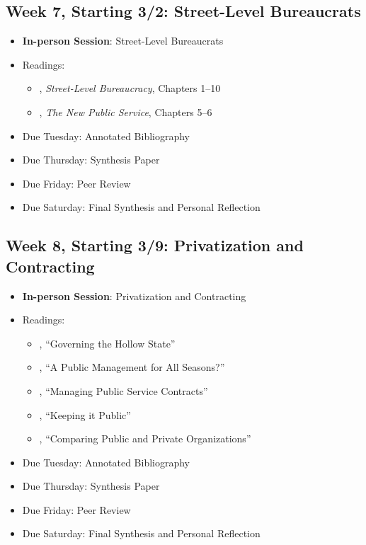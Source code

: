 \documentclass[12pt, letterpaper]{article}
\begin{document}
\subsection*{Week 7, Starting 3/2: Street-Level Bureaucrats}
\begin{itemize}
    \item \textbf{In-person Session}: Street-Level Bureaucrats
    \item Readings:
        \begin{itemize}
            \item \citet{Lipsky2010}, \emph{Street-Level Bureaucracy}, Chapters 1--10 
            \item \citet{Denhardt2015}, \emph{The New Public Service}, Chapters 5--6 
        \end{itemize}
    \item Due Tuesday: Annotated Bibliography
    \item Due Thursday: Synthesis Paper
    \item Due Friday: Peer Review
    \item Due Saturday: Final Synthesis and Personal Reflection
\end{itemize}

\subsection*{Week 8, Starting 3/9: Privatization and Contracting}
\begin{itemize}
    \item \textbf{In-person Session}: Privatization and Contracting
    \item Readings:
        \begin{itemize}
            \item \citet{MILWARD2000a}, ``Governing the Hollow State''
            \item \cite{hood1991}, ``A Public Management for All Seasons?''
            \item \citet{brownManagingPublicService2006}, ``Managing Public Service Contracts''
            \item \citet{jos2009}, ``Keeping it Public''
            \item \citet{raineyComparingPublicPrivate2000}, ``Comparing Public and Private Organizations''
        \end{itemize}
    \item Due Tuesday: Annotated Bibliography
    \item Due Thursday: Synthesis Paper
    \item Due Friday: Peer Review
    \item Due Saturday: Final Synthesis and Personal Reflection
\end{itemize}
\end{document}

